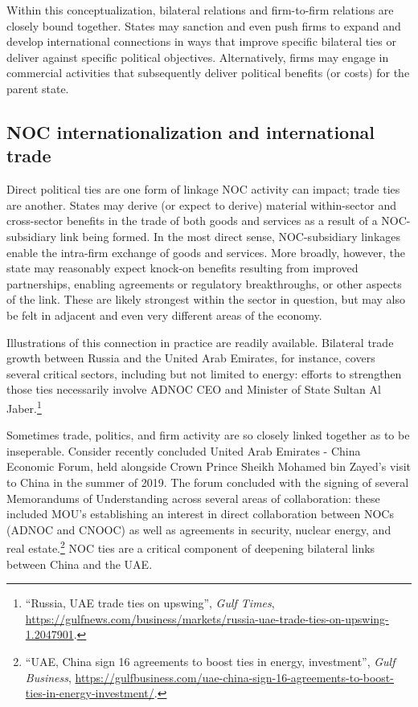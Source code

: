\documentclass[11pt,]{book}
\begin{document}
Within this conceptualization, bilateral relations and firm-to-firm relations are closely bound together. States may sanction and even push firms to expand and develop international connections in ways that improve specific bilateral ties or deliver against specific political objectives. Alternatively, firms may engage in commercial activities that subsequently deliver political benefits (or costs) for the parent state.

\hypertarget{noc-internationalization-and-international-trade}{%
\subsection{NOC internationalization and international trade}\label{noc-internationalization-and-international-trade}}

Direct political ties are one form of linkage NOC activity can impact; trade ties are another. States may derive (or expect to derive) material within-sector and cross-sector benefits in the trade of both goods and services as a result of a NOC-subsidiary link being formed. In the most direct sense, NOC-subsidiary linkages enable the intra-firm exchange of goods and services. More broadly, however, the state may reasonably expect knock-on benefits resulting from improved partnerships, enabling agreements or regulatory breakthroughs, or other aspects of the link. These are likely strongest within the sector in question, but may also be felt in adjacent and even very different areas of the economy.

Illustrations of this connection in practice are readily available. Bilateral trade growth between Russia and the United Arab Emirates, for instance, covers several critical sectors, including but not limited to energy: efforts to strengthen those ties necessarily involve ADNOC CEO and Minister of State Sultan Al Jaber.\footnote{``Russia, UAE trade ties on upswing'', \emph{Gulf Times}, \url{https://gulfnews.com/business/markets/russia-uae-trade-ties-on-upswing-1.2047901}.}

Sometimes trade, politics, and firm activity are so closely linked together as to be inseperable. Consider recently concluded United Arab Emirates - China Economic Forum, held alongside Crown Prince Sheikh Mohamed bin Zayed's visit to China in the summer of 2019. The forum concluded with the signing of several Memorandums of Understanding across several areas of collaboration: these included MOU's establishing an interest in direct collaboration between NOCs (ADNOC and CNOOC) as well as agreements in security, nuclear energy, and real estate.\footnote{``UAE, China sign 16 agreements to boost ties in energy, investment'', \emph{Gulf Business}, \url{https://gulfbusiness.com/uae-china-sign-16-agreements-to-boost-ties-in-energy-investment/}.} NOC ties are a critical component of deepening bilateral links between China and the UAE.
\end{document}
